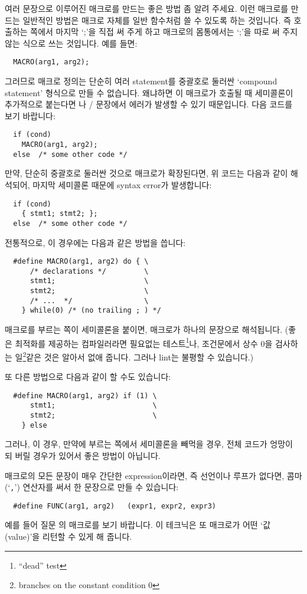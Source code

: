 \begin{faq}
	여러 문장으로 이루어진 매크로를 만드는 좋은 방법 좀 알려
	주세요.
\A	
	이런 매크로를 만드는 일반적인 방법은 매크로 자체를 일반 함수처럼
	쓸 수 있도록 하는 것입니다.  즉 호출하는 쪽에서 마지막 `;'을 직접
	써 주게 하고 매크로의 몸통에서는 `;'을 따로 써 주지 않는 식으로
	쓰는 것입니다.  예를 들면:
\begin{verbatim}
  MACRO(arg1, arg2);
\end{verbatim}
	그러므로 매크로 정의는 단순히 
        여러 statement를 중괄호로 둘러싼 `compound statement' 형식으로
	만들 수 없습니다.  왜냐하면 이 매크로가 호출될 때 세미콜론이 추가적으로
	붙는다면 나 / 문장에서 에러가 발생할 수
	있기 때문입니다. 다음 코드를 보기 바랍니다:
\begin{verbatim}
  if (cond)
    MACRO(arg1, arg2);
  else  /* some other code */
\end{verbatim}
	\noindent 만약, 단순히 중괄호로 둘러싼 것으로 매크로가 확장된다면,
        위 코드는 다음과 같이 해석되어, 마지막 세미콜론 때문에 syntax error가
        발생합니다:
\begin{verbatim}
  if (cond)
    { stmt1; stmt2; };
  else  /* some other code */
\end{verbatim}
	전통적으로, 이 경우에는 다음과 같은 방법을 씁니다:
\begin{verbatim}
  #define MACRO(arg1, arg2) do { \
      /* declarations */         \
      stmt1;                     \
      stmt2;                     \
      /* ...  */                 \
    } while(0) /* (no trailing ; ) */
\end{verbatim}
	매크로를 부르는 쪽이 세미콜론을 붙이면, 매크로가 하나의 문장으로
	해석됩니다.  (좋은 최적화를 제공하는 컴파일러라면 필요없는 
	테스트\footnote{``dead'' test}나,
	조건문에서 상수 0을 검사하는 일\footnote{branches on the constant
	condition 0}같은 것은 알아서 없애 줍니다.  그러나
	lint는 불평할 수 있습니다.)

        또 다른 방법으로 다음과 같이 할 수도 있습니다:
\begin{verbatim}
  #define MACRO(arg1, arg2) if (1) \
      stmt1;                       \
      stmt2;                       \
    } else
\end{verbatim}
	그러나, 이 경우, 만약에 부르는 쪽에서 세미콜론을 빼먹을 경우,
        전체 코드가 엉망이 되 버릴 경우가 있어서 좋은 방법이 아닙니다.

	매크로의 모든 문장이 매우 간단한 expression이라면,
        즉 선언이나 루프가 없다면,
	콤마(`\verb+,+') 연산자를 써서 한 문장으로 만들 수 있습니다:
\begin{verbatim}
  #define FUNC(arg1, arg2)   (expr1, expr2, expr3)
\end{verbatim}
	\noindent 예를 들어 질문 \ql{10.26}의  매크로를 보기 바랍니다.
	이 테크닉은 또 매크로가 어떤 `값(value)'을 리턴할 수 있게 해 줍니다.


\end{faq}
